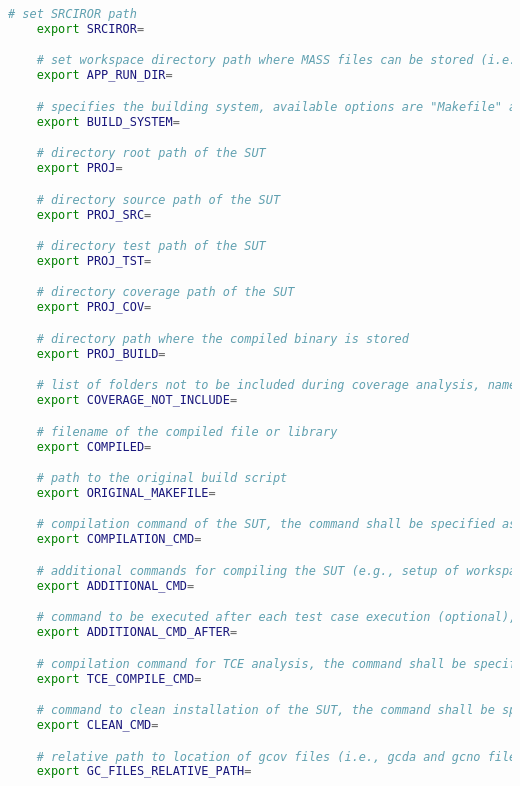 \begin{lstlisting}[language=bash,label=listing:MASS:conf,caption=Excerpt of mass\_conf.sh file.]
	# set SRCIROR path
	export SRCIROR=

	# set workspace directory path where MASS files can be stored (i.e., $INSTALL_DIR)
	export APP_RUN_DIR=

	# specifies the building system, available options are "Makefile" and "waf"
	export BUILD_SYSTEM=

	# directory root path of the SUT
	export PROJ=

	# directory source path of the SUT
	export PROJ_SRC=

	# directory test path of the SUT
	export PROJ_TST=

	# directory coverage path of the SUT
	export PROJ_COV=

	# directory path where the compiled binary is stored
	export PROJ_BUILD=

	# list of folders not to be included during coverage analysis, name folders shall be separated by '\|' 
	export COVERAGE_NOT_INCLUDE=

	# filename of the compiled file or library 
	export COMPILED=

	# path to the original build script        
	export ORIGINAL_MAKEFILE=

	# compilation command of the SUT, the command shall be specified as a Bash array, e.g., (). Special characters shall be escaped.
	export COMPILATION_CMD=

	# additional commands for compiling the SUT (e.g., setup of workspace), the command shall be specified as a Bash array, e.g., (). Special characters shall be escaped.
	export ADDITIONAL_CMD=

	# command to be executed after each test case execution (optional), the command shall be specified as a Bash array, e.g., (). Special characters shall be escaped.
	export ADDITIONAL_CMD_AFTER=

	# compilation command for TCE analysis, the command shall be specified as a Bash array, e.g., (). Special characters shall be escaped.
	export TCE_COMPILE_CMD=

	# command to clean installation of the SUT, the command shall be specified as a Bash array, e.g., (). Special characters shall be escaped.
	export CLEAN_CMD=

	# relative path to location of gcov files (i.e., gcda and gcno files)
	export GC_FILES_RELATIVE_PATH=
\end{lstlisting}

